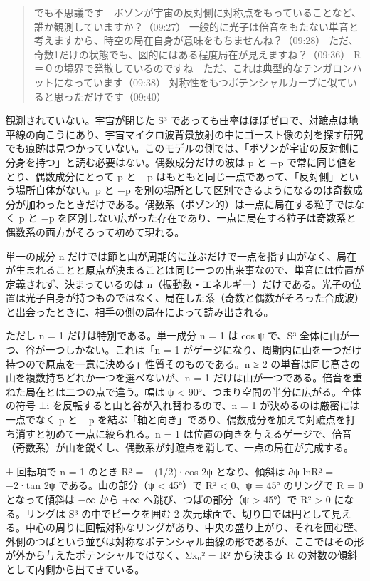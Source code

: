 \documentclass[
  a4paper,
]{ltjsarticle}
\begin{document}
\begin{quote}
でも不思議です　ボゾンが宇宙の反対側に対称点をもっていることなど、誰か観測していますか？（09:27）
一般的に光子は倍音をもたない単音と考えますから、時空の局在自身が意味をもちませんね？（09:28）
ただ、奇数1だけの状態でも、図的にはある程度局在が見えますね？（09:36）
R＝０の境界で発散しているのですね　ただ、これは典型的なテンガロンハットになっています（09:38）
対称性をもつポテンシャルカーブに似ていると思っただけです（09:40）
\end{quote}

観測されていない。宇宙が閉じた S³
であっても曲率はほぼゼロで、対蹠点は地平線の向こうにあり、宇宙マイクロ波背景放射の中にゴースト像の対を探す研究でも痕跡は見つかっていない。このモデルの側では、「ボゾンが宇宙の反対側に分身を持つ」と読む必要はない。偶数成分だけの波は
p と −p で常に同じ値をとり、偶数成分にとって p と −p
はもともと同じ一点であって、「反対側」という場所自体がない。p と −p
を別の場所として区別できるようになるのは奇数成分が加わったときだけである。偶数系（ボゾン的）は一点に局在する粒子ではなく
p と −p
を区別しない広がった存在であり、一点に局在する粒子は奇数系と偶数系の両方がそろって初めて現れる。

単一の成分 n
だけでは節と山が周期的に並ぶだけで一点を指す山がなく、局在が生まれることと原点が決まることは同じ一つの出来事なので、単音には位置が定義されず、決まっているのは
n（振動数・エネルギー）だけである。光子の位置は光子自身が持つものではなく、局在した系（奇数と偶数がそろった合成波）と出会ったときに、相手の側の局在によって読み出される。

ただし n = 1 だけは特別である。単一成分 n = 1 は cos ψ で、S³
全体に山が一つ、谷が一つしかない。これは「n = 1
がゲージになり、周期内に山を一つだけ持つので原点を一意に決める」性質そのものである。n
≥ 2 の単音は同じ高さの山を複数持ちどれか一つを選べないが、n = 1
だけは山が一つである。倍音を重ねた局在とは二つの点で違う。幅は ψ
\textless{} 90°、つまり空間の半分に広がる。全体の符号 ±i
を反転すると山と谷が入れ替わるので、n = 1 が決めるのは厳密には一点でなく
p と −p
を結ぶ「軸と向き」であり、偶数成分を加えて対蹠点を打ち消すと初めて一点に絞られる。n
= 1
は位置の向きを与えるゲージで、倍音（奇数系）が山を鋭くし、偶数系が対蹠点を消して、一点の局在が完成する。

± 回転項で n = 1 のとき R² = −(1/2)·cos 2ψ となり、傾斜は ∂ψ
ln\textbar R²\textbar{} = −2·tan 2ψ である。山の部分（ψ \textless{}
45°）で R² \textless{} 0、ψ = 45° のリングで R = 0 となって傾斜は −∞
から +∞ へ跳び、つばの部分（ψ \textgreater{} 45°）で R² \textgreater{} 0
になる。リングは S³ の中でピークを囲む 2
次元球面で、切り口では円として見える。中心の周りに回転対称なリングがあり、中央の盛り上がり、それを囲む壁、外側のつばという並びは対称なポテンシャル曲線の形であるが、ここではその形が外から与えたポテンシャルではなく、Σxₙ²
= R² から決まる R の対数の傾斜として内側から出てきている。
\end{document}
